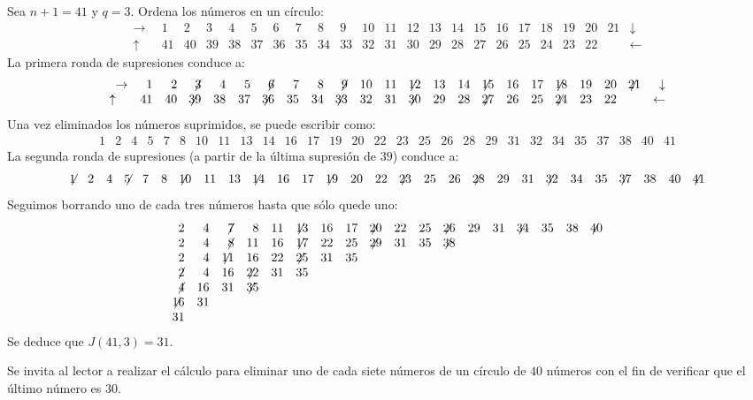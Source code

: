 \begin{example}
Sea $n+1=41$ y $q=3$. Ordena los números en un círculo:
\[
\begin{array}{rrrrrrrrrrrrrrrrrrrrrrr}
\rightarrow&1&2&3&4&5&6&7&8&9&10&
           11&12&13&14&15&16&17&18&19&20&21&
\downarrow\\
\uparrow\quad&41&40&39&38&37&36&35&34&33&
32&31&30&29&28&27&26&25&24&23&22&
&\leftarrow
\end{array}
\]
La primera ronda de supresiones conduce a:
\[
\begin{array}{rrrrrrrrrrrrrrrrrrrrrrr}
\rightarrow&1&2&\not\! 3&4&5&\not\! 6&7&8&\not\! 9&10&
           11&\not\!\! 12&13&14&\not\!\! 15&16&17&\not\!\! 18&19&20&\not\!\! 21&
\downarrow\\
	\uparrow\quad&41&40&\not\!\! 39&38&37&\not\!\! 36&35&34&\not\!\! 33&
32&31&\not\!\! 30&29&28&\not\!\! 27&26&25&\not\!\! 24&23&22&
&\leftarrow
\end{array}
\]
Una vez eliminados los números suprimidos, se puede escribir como:
\[
\begin{array}{rrrrrrrrrrrrrrrrrrrrrrrrrrrr}
1&2&4&5&7&8&10&11&13&14&16&17&19&20&
22&23&25&26&28&29&31&32&34&35&37&38&40&41
\end{array}
\]
La segunda ronda de supresiones (a partir de la última supresión de $39$) conduce a:
\[
\begin{array}{rrrrrrrrrrrrrrrrrrrrrrrrrrrr}
\not\!\! 1&2&4&\not\!\! 5&7&8&\not\!\! 10&11&13&\not\!\! 14&16&17&\not\!\! 19&20&
22&\not\!\! 23&25&26&\not\!\! 28&29&31&\not\!\! 32&34&35&\not\!\! 37&38&40&\not\!\! 41
\end{array}
\]
Seguimos borrando uno de cada tres números hasta que sólo quede uno:
\[
\begin{array}{rrrrrrrrrrrrrrrrrr}
2&4&\not\!7&8&11&\not\!\!13&16&17&\not\!\!20&22&25&\not\!\!26&29&31&\not\!\!34&35&38&\not\!\!40
\\
2&4&\not\!8&11&16&\not\!\!17&22&25&\not\!\!29&31&35&\not\!\!38
\\
2&4&\not\!\!11&16&22&\not\!\!25&31&35
\\
\not\!2&4&16&\not\!\!22&31&35
\\
\not\!4&16&31&\not\!\!35
\\
\not\!\!16&31
\\
31
\end{array}
\]
Se deduce que $J(41,3)=31$.
\end{example}

Se invita al lector a realizar el cálculo para eliminar uno de cada siete números de un círculo de $40$ números con el fin de verificar que el último número es $30$.

